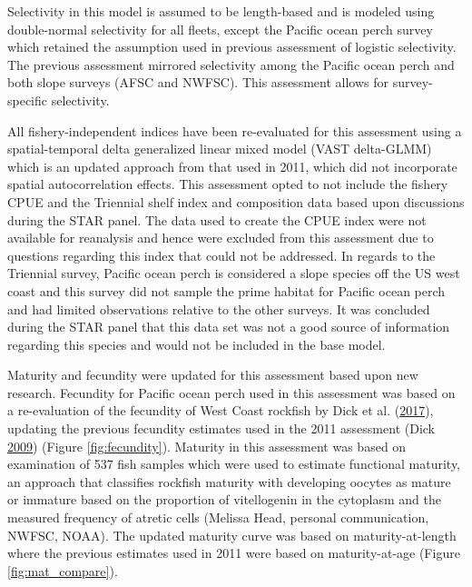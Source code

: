 \documentclass[12pt,]{article}
\begin{document}
Selectivity in this model is assumed to be length-based and is modeled
using double-normal selectivity for all fleets, except the Pacific ocean
perch survey which retained the assumption used in previous assessment
of logistic selectivity. The previous assessment mirrored selectivity
among the Pacific ocean perch and both slope surveys (AFSC and NWFSC).
This assessment allows for survey-specific selectivity.

All fishery-independent indices have been re-evaluated for this
assessment using a spatial-temporal delta generalized linear mixed model
(VAST delta-GLMM) which is an updated approach from that used in 2011,
which did not incorporate spatial autocorrelation effects. This
assessment opted to not include the fishery CPUE and the Triennial shelf
index and composition data based upon discussions during the STAR panel.
The data used to create the CPUE index were not available for reanalysis
and hence were excluded from this assessment due to questions regarding
this index that could not be addressed. In regards to the Triennial
survey, Pacific ocean perch is considered a slope species off the US
west coast and this survey did not sample the prime habitat for Pacific
ocean perch and had limited observations relative to the other surveys.
It was concluded during the STAR panel that this data set was not a good
source of information regarding this species and would not be included
in the base model.

Maturity and fecundity were updated for this assessment based upon new
research. Fecundity for Pacific ocean perch used in this assessment was
based on a re-evaluation of the fecundity of West Coast rockfish by Dick
et al. (\protect\hyperlink{ref-dick_meta-analysis_2017}{2017}), updating
the previous fecundity estimates used in the 2011 assessment (Dick
\protect\hyperlink{ref-dick_modeling_2009}{2009}) (Figure
\ref{fig:fecundity}). Maturity in this assessment was based on
examination of 537 fish samples which were used to estimate functional
maturity, an approach that classifies rockfish maturity with developing
oocytes as mature or immature based on the proportion of vitellogenin in
the cytoplasm and the measured frequency of atretic cells (Melissa Head,
personal communication, NWFSC, NOAA). The updated maturity curve was
based on maturity-at-length where the previous estimates used in 2011
were based on maturity-at-age (Figure \ref{fig:mat_compare}).
\end{document}
